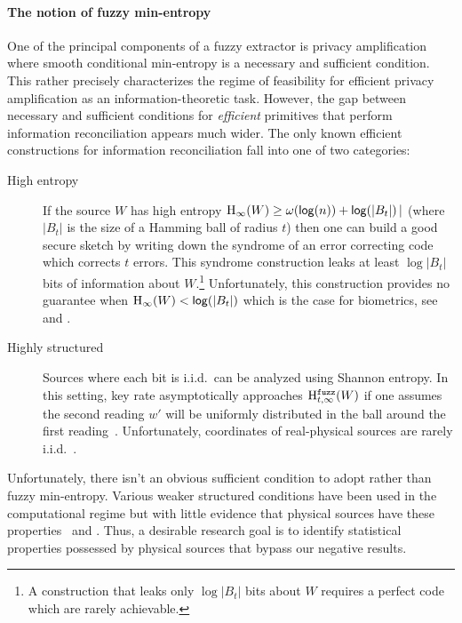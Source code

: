 \paragraph{The notion of fuzzy min-entropy}
One of the principal components of a fuzzy extractor is privacy amplification where smooth conditional min-entropy is a necessary and sufficient condition.  This rather precisely characterizes the regime
of feasibility for efficient privacy amplification as an
information-theoretic task.  However, the gap between necessary and sufficient conditions for \emph{efficient} primitives that perform information reconciliation appears much wider. The only known efficient constructions for information reconciliation fall into one of two categories:
\begin{description}
\item[High entropy] If the source $W$ has high entropy $\mathrm{H}_\infty(W)\ge \omega(\mathsf{log}\!\left(n\right)) + \mathsf{log}\!\left(|B_t|\right)|$ (where $|B_t|$ is the size of a Hamming ball of radius $t$) then one can build a good secure sketch by writing down the syndrome of an error correcting code which corrects $t$ errors.  This syndrome construction  leaks at least $\log{|B_t|}$ bits of information about $W$.\footnote{A construction that leaks only $\log{|B_t|}$ bits about $W$ requires a perfect code which are rarely achievable.}  Unfortunately, this construction provides no guarantee when $\mathrm{H}_\infty(W)< \mathsf{log}\!\left(|B_t|\right)$ which is the case for biometrics, see \cite[Proposition 1]{canetti2021reusable} and \cite[Introduction]{simhadri2019cryptographic}.
\item[Highly structured] Sources where each bit is i.i.d.\ can be analyzed using Shannon entropy.  In this setting, key rate asymptotically approaches $\mathrm{H}^{\mathtt{fuzz}}_{t,\infty}(W)$ if one assumes the second reading $w'$ will be uniformly distributed in the ball around the first reading~\cite[Theorem 2]{tuyls2004capacity}.  Unfortunately, coordinates of real-physical sources are rarely i.i.d.~\cite{daugman2004}.
\end{description}

Unfortunately, there isn't an obvious sufficient condition to adopt
rather than fuzzy min-entropy.  Various weaker structured conditions
have been used in the computational regime but with little evidence
that physical sources have these properties~\cite[Figure
1]{demarest2021code} and \cite{simhadri2019cryptographic}. Thus, a desirable
research goal is to identify statistical properties possessed by physical
sources that bypass our negative results.

